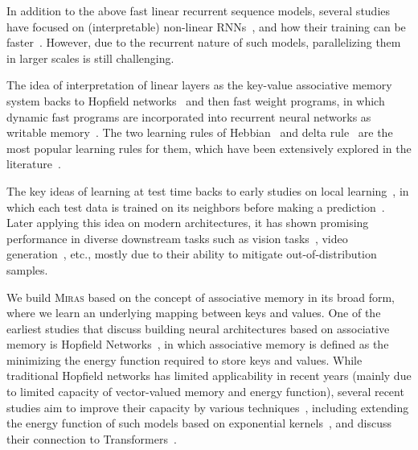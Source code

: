 \documentclass{article}
\newcommand{\citep}{\parencite}
\newcommand{\framework}[0]{\textsc{Miras}}
\theoremstyle{plain}
\theoremstyle{definition}
\theoremstyle{remark}
\newcommand{\head}[1]{\vspace{1.7mm}\noindent{{\textcolor{c2}{\bf #1.}}}}
\begin{document}
In addition to the above fast linear recurrent sequence models, several studies have focused on (interpretable) non-linear RNNs~\citep{csordas2024recurrent, merrill2024the, lim2024parallelizing,  schone2025implicit, karami2025lattice, von2023uncovering, gonzalez2024towards}, and how their training can be faster~\citep{gonzalez2024towards, lim2024parallelizing, schone2025implicit}. However, due to the recurrent nature of such models, parallelizing them in larger scales is still challenging. 

\head{Fast Weight Programs}
The idea of interpretation of linear layers as the key-value associative memory system backs to Hopfield networks~\citep{hopfield1982neural} and then fast weight programs, in which dynamic fast programs are incorporated into recurrent neural networks as writable memory~\citep{schlag2021linear, schmidhuber1992learning, schmidhuber1993reducing}. The two learning rules of Hebbian~\citep{hebb2005organization} and delta rule~\citep{prados1989neural} are the most popular learning rules for them, which have been extensively explored in the literature~\citep{munkhdalai2017neural, schmidhuber1992learning, munkhdalai2019metalearned, schlag2021linear, irie2021going, yang2024parallelizing, yang2024gated}. 

\head{Test Time Training}
The key ideas of learning at test time backs to early studies on local learning~\cite{bottou1992local}, in which each test data is trained on its neighbors before making a prediction~\citep{zhang2006svm, gandelsman2022test}. Later applying this idea on modern architectures, it has shown promising performance in diverse downstream tasks such as vision tasks~\citep{jain2011online, mullapudi2019online}, video generation~\citep{dalal2025one}, etc., mostly due to their ability to mitigate out-of-distribution samples. 

\head{Hopfield Networks}
We build \framework{} based on the concept of associative memory in its broad form, where we learn an underlying mapping between keys and values. One of the earliest studies that discuss building neural architectures based on associative memory is Hopfield Networks~\citep{hopfield1982neural}, in which associative memory is defined as the minimizing the energy function required to store keys and values. While traditional Hopfield networks has limited applicability in recent years (mainly due to limited capacity of vector-valued memory and energy function), several recent studies aim to improve their capacity by various techniques~\citep{krotov2021hierarchical, li2024expressive, krotov2016dense}, including extending the energy function of such models based on exponential kernels~\citep{krotov2016dense, lucibello2024exponential}, and discuss their connection to Transformers~\citep{ramsauer2021hopfield, hu2024provably}.   
\end{document}
